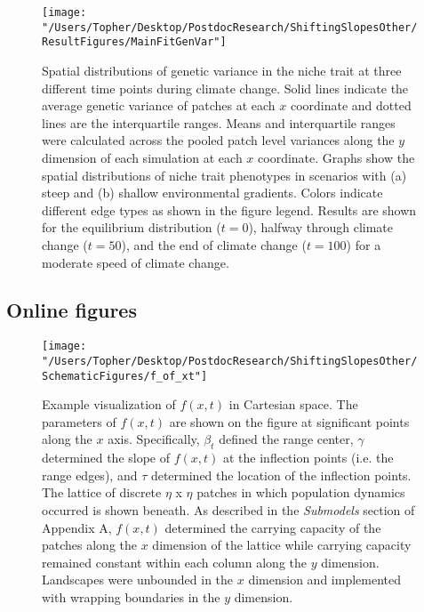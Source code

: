 \documentclass[11pt]{article}
\begin{document}
\begin{figure}[h!]
\texttt{[image: "/Users/Topher/Desktop/PostdocResearch/ShiftingSlopesOther/ResultFigures/MainFitGenVar"]}
\caption{Spatial distributions of genetic variance in the niche trait at three different time points during climate change. Solid lines indicate the average genetic variance of patches at each $x$ coordinate and dotted lines are the interquartile ranges. Means and interquartile ranges were calculated across the pooled patch level variances along the $y$ dimension of each simulation at each $x$ coordinate. Graphs show the spatial distributions of niche trait phenotypes in scenarios with (a) steep and (b) shallow environmental gradients. Colors indicate different edge types as shown in the figure legend. Results are shown for the equilibrium distribution ($t = 0$), halfway through climate change ($t = 50$), and the end of climate change ($t = 100$) for a moderate speed of climate change.}
\label{fig:FitGenVar}
\end{figure}

\clearpage

\subsection*{Online figures}

\renewcommand{\thefigure}{A\arabic{figure}}
\setcounter{figure}{0}

\begin{figure}[h!]
\texttt{[image: "/Users/Topher/Desktop/PostdocResearch/ShiftingSlopesOther/SchematicFigures/f\_of\_xt"]}
\caption{Example visualization of $f(x,t)$ in Cartesian space. The parameters of $f(x,t)$ are shown on the figure at significant points along the $x$ axis. Specifically, $\beta_{t}$ defined the range center, $\gamma$ determined the slope of $f(x,t)$ at the inflection points (i.e. the range edges), and $\tau$ determined the location of the inflection points. The lattice of discrete $\eta$ x $\eta$ patches in which population dynamics occurred is shown beneath. As described in the \textit{Submodels} section of Appendix A, $f(x,t)$ determined the carrying capacity of the patches along the $x$ dimension of the lattice while carrying capacity remained constant within each column along the $y$ dimension. Landscapes were unbounded in the $x$ dimension and implemented with wrapping boundaries in the $y$ dimension.}
\label{Fig:EnvFunction}
\end{figure}
\end{document}
